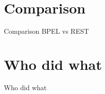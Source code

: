 \section{Comparison}
\begin{frame}{Comparison BPEL vs REST}

\end{frame}


\section{Who did what}
\begin{frame}{Who did what}

\end{frame}


